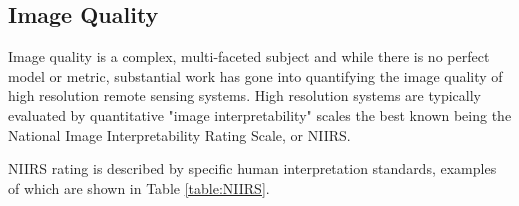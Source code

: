 \documentclass[10pt,journal]{IEEEtran}  %
\begin{document}
\subsection{Image Quality}
\label{sec:iq}

Image quality is a complex, multi-faceted subject and while there is no perfect model or metric, substantial work has gone into quantifying the image quality of high resolution remote sensing systems.  High resolution systems are typically evaluated by quantitative "image interpretability" scales the best known being the National Image Interpretability Rating Scale, or NIIRS.

NIIRS rating is described by specific human interpretation standards, examples of which are shown in Table \ref{table:NIIRS}\cite{niirs}.

\begin{table}[h!b]
\centering
\caption{NIIRS definitions}
\label{table:NIIRS}
\end{table}
\end{document}

